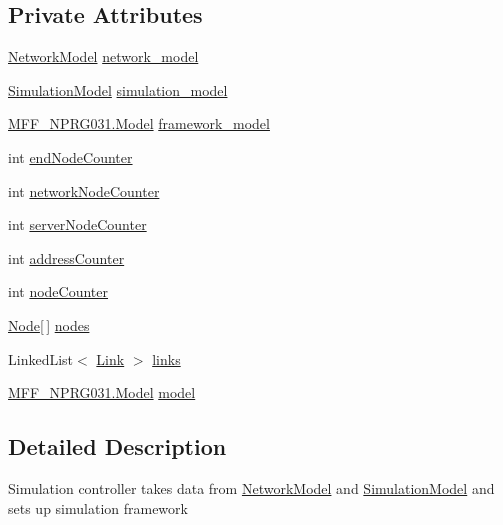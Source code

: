 \subsection*{Private Attributes}
\begin{DoxyCompactItemize}
\item 
\hyperlink{classNetTrafficSimulator_1_1NetworkModel}{Network\-Model} \hyperlink{classNetTrafficSimulator_1_1SimulationController_a80c4b1d3b982e591f530bf5877b259fa}{network\-\_\-model}
\item 
\hyperlink{classNetTrafficSimulator_1_1SimulationModel}{Simulation\-Model} \hyperlink{classNetTrafficSimulator_1_1SimulationController_a26441a135203881caae479f93f17e288}{simulation\-\_\-model}
\item 
\hyperlink{classMFF__NPRG031_1_1Model}{M\-F\-F\-\_\-\-N\-P\-R\-G031.\-Model} \hyperlink{classNetTrafficSimulator_1_1SimulationController_a3037a65e37c5c5e894bc584b8fe5c12d}{framework\-\_\-model}
\item 
int \hyperlink{classNetTrafficSimulator_1_1SimulationController_a9d07f9372ee5eeacefcb4d0448122f6d}{end\-Node\-Counter}
\item 
int \hyperlink{classNetTrafficSimulator_1_1SimulationController_a2b2363037a31bae97e4aede4af2512c4}{network\-Node\-Counter}
\item 
int \hyperlink{classNetTrafficSimulator_1_1SimulationController_a59a626f2fc2b81873ef548f2d7d04948}{server\-Node\-Counter}
\item 
int \hyperlink{classNetTrafficSimulator_1_1SimulationController_a79f2fd9be4b8d9070494975f9d470563}{address\-Counter}
\item 
int \hyperlink{classNetTrafficSimulator_1_1SimulationController_ada67d39ff4d7f0595b295b895216abf4}{node\-Counter}
\item 
\hyperlink{classNetTrafficSimulator_1_1Node}{Node}\mbox{[}$\,$\mbox{]} \hyperlink{classNetTrafficSimulator_1_1SimulationController_a63041df0cb83bab3ee4db1505656e806}{nodes}
\item 
Linked\-List$<$ \hyperlink{classNetTrafficSimulator_1_1Link}{Link} $>$ \hyperlink{classNetTrafficSimulator_1_1SimulationController_a5c83a56d28d5336e08efd3d893e47381}{links}
\item 
\hyperlink{classMFF__NPRG031_1_1Model}{M\-F\-F\-\_\-\-N\-P\-R\-G031.\-Model} \hyperlink{classNetTrafficSimulator_1_1SimulationController_a28227ccfab6fb0d8e41ae0975ee7a5af}{model}
\end{DoxyCompactItemize}


\subsection{Detailed Description}
Simulation controller takes data from \hyperlink{classNetTrafficSimulator_1_1NetworkModel}{Network\-Model} and \hyperlink{classNetTrafficSimulator_1_1SimulationModel}{Simulation\-Model} and sets up simulation framework 

